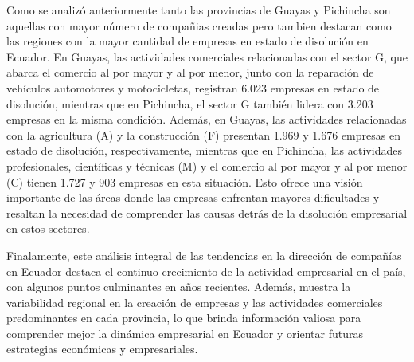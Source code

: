 \documentclass[
]{article}
\begin{document}
Como se analizó anteriormente tanto las provincias de Guayas y Pichincha
son aquellas con mayor número de compañias creadas pero tambien destacan
como las regiones con la mayor cantidad de empresas en estado de
disolución en Ecuador. En Guayas, las actividades comerciales
relacionadas con el sector G, que abarca el comercio al por mayor y al
por menor, junto con la reparación de vehículos automotores y
motocicletas, registran 6.023 empresas en estado de disolución, mientras
que en Pichincha, el sector G también lidera con 3.203 empresas en la
misma condición. Además, en Guayas, las actividades relacionadas con la
agricultura (A) y la construcción (F) presentan 1.969 y 1.676 empresas
en estado de disolución, respectivamente, mientras que en Pichincha, las
actividades profesionales, científicas y técnicas (M) y el comercio al
por mayor y al por menor (C) tienen 1.727 y 903 empresas en esta
situación. Esto ofrece una visión importante de las áreas donde las
empresas enfrentan mayores dificultades y resaltan la necesidad de
comprender las causas detrás de la disolución empresarial en estos
sectores.

Finalamente, este análisis integral de las tendencias en la dirección de
compañías en Ecuador destaca el continuo crecimiento de la actividad
empresarial en el país, con algunos puntos culminantes en años
recientes. Además, muestra la variabilidad regional en la creación de
empresas y las actividades comerciales predominantes en cada provincia,
lo que brinda información valiosa para comprender mejor la dinámica
empresarial en Ecuador y orientar futuras estrategias económicas y
empresariales.
\end{document}
